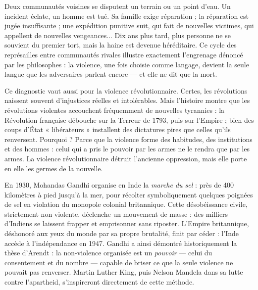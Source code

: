 \documentclass[11pt]{article}
\newcommand{\cle}[1]{{\popxbold\color{popdark}#1}}
\newcounter{popsec}
\newcounter{popsub}
\newcommand{\courssub}[1]{%
  \stepcounter{popsub}%
  \par\vspace{9pt}\noindent{\popxbold\fontsize{11.5}{13}\selectfont\color{popink}{\color{poporange}\thepopsec.\thepopsub}\hspace{6pt}#1}\par\nopagebreak\vspace{4pt}
}
\begin{document}
\begin{exemplebox}
Deux communautés voisines se disputent un terrain ou un point d'eau. Un incident éclate, un homme est tué. Sa famille exige réparation ; la réparation est jugée insuffisante ; une expédition punitive suit, qui fait de nouvelles victimes, qui appellent de nouvelles vengeances... Dix ans plus tard, plus personne ne se souvient du premier tort, mais la haine est devenue héréditaire. Ce cycle des représailles entre communautés rivales illustre exactement l'engrenage dénoncé par les philosophes : la violence, une fois choisie comme langage, devient la seule langue que les adversaires parlent encore — et elle ne dit que la mort.
\end{exemplebox}

Ce diagnostic vaut aussi pour la \cle{violence révolutionnaire}. Certes, les révolutions naissent souvent d'injustices réelles et intolérables. Mais l'histoire montre que les révolutions violentes accouchent fréquemment de nouvelles tyrannies : la Révolution française débouche sur la Terreur de 1793, puis sur l'Empire ; bien des coups d'État « libérateurs » installent des dictatures pires que celles qu'ils renversent. Pourquoi ? Parce que la violence forme des habitudes, des institutions et des hommes : celui qui a pris le pouvoir par les armes ne le rendra que par les armes. La violence révolutionnaire détruit l'ancienne oppression, mais elle porte en elle les germes de la nouvelle.

\begin{savaistu}
En 1930, Mohandas Gandhi organise en Inde la \emph{marche du sel} : près de 400 kilomètres à pied jusqu'à la mer, pour récolter symboliquement quelques poignées de sel en violation du monopole colonial britannique. Cette désobéissance civile, strictement non violente, déclenche un mouvement de masse : des milliers d'Indiens se laissent frapper et emprisonner sans riposter. L'Empire britannique, déshonoré aux yeux du monde par sa propre brutalité, finit par céder : l'Inde accède à l'indépendance en 1947. Gandhi a ainsi démontré historiquement la thèse d'Arendt : la non-violence organisée est un \emph{pouvoir} — celui du consentement et du nombre — capable de briser ce que la seule violence ne pouvait pas renverser. Martin Luther King, puis Nelson Mandela dans sa lutte contre l'apartheid, s'inspireront directement de cette méthode.
\end{savaistu}

\courssub{La critique de la guerre : Erasme et Kant}
\end{document}
